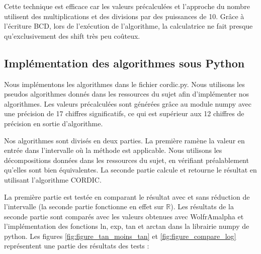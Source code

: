 \documentclass{article}
\def\cordicPythonFile{cordic.py}
\begin{document}
\vspace{1em}

Cette technique est efficace car les valeurs précalculées et l'approche du nombre utilisent des multiplications et des divisions par des puissances de 10. Grâce à l'écriture BCD, lors de l'exécution de l'algorithme, la calculatrice ne fait presque qu'exclusivement des shift très peu coûteux.

\subsection*{Implémentation des algorithmes sous Python}

Nous implémentons les algorithmes dans le fichier \cordicPythonFile. Nous utilisons les pseudos algorithmes donnés dans les ressources du sujet afin d'implémenter nos algorithmes. Les valeurs précalculées sont générées grâce au module numpy avec une précision de 17 chiffres significatifs, ce qui est supérieur aux 12 chiffres de précision en sortie d'algorithme.

Nos algorithmes sont divisés en deux parties. La première ramène la valeur en entrée dans l'intervalle où la méthode est applicable. Nous utilisons les décompositions données dans les ressources du sujet, en vérifiant préalablement qu'elles sont bien équivalentes. La seconde partie calcule et retourne le résultat en utilisant l'algorithme CORDIC.

La première partie est testée en comparant le résultat avec et sans réduction de l'intervalle (la seconde partie fonctionne en effet sur $\mathbb{R}$). Les résultats de la seconde partie sont comparés avec les valeurs  obtenues avec WolfrAmalpha et l'implémentation des fonctions ln, exp, tan et arctan dans la librairie numpy de python. Les figures \ref{fig:figure_tan_moins_tan} et \ref{fig:figure_compare_log} représentent une partie des résultats des tests :
\end{document}
